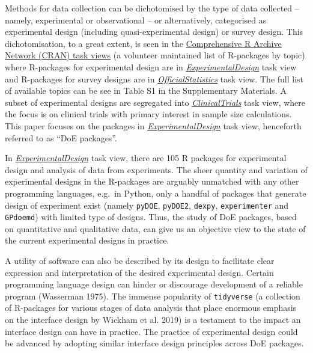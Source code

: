 \documentclass{article}
\begin{document}
Methods for data collection can be dichotomised by the type of data
collected -- namely, experimental or observational -- or alternatively,
categorised as experimental design (including quasi-experimental design)
or survey design. This dichotomisation, to a great extent, is seen in
the \href{https://cran.r-project.org/web/views/}{Comprehensive R Archive
Network (CRAN) task views} (a volunteer maintained list of R-packages by
topic) where R-packages for experimental design are in
\href{http://CRAN.R-project.org/view=ExperimentalDesign}{\emph{ExperimentalDesign}}
task view and R-packages for survey designs are in
\href{http://CRAN.R-project.org/view=OfficialStatistics}{\emph{OfficialStatistics}}
task view. The full list of available topics can be see in Table S1 in
the Supplementary Materials. A subset of experimental designs are
segregated into
\href{http://CRAN.R-project.org/view=ClinicalTrials}{\emph{ClinicalTrials}}
task view, where the focus is on clinical trials with primary interest
in sample size calculations. This paper focuses on the packages in
\href{http://CRAN.R-project.org/view=ExperimentalDesign}{\emph{ExperimentalDesign}}
task view, henceforth referred to as ``DoE packages''.

In
\href{http://CRAN.R-project.org/view=ExperimentalDesign}{\emph{ExperimentalDesign}}
task view, there are 105 R packages for experimental design and analysis
of data from experiments. The sheer quantity and variation of
experimental designs in the R-packages are arguably unmatched with any
other programming languages, e.g.~in Python, only a handful of packages
that generate design of experiment exist (namely \texttt{pyDOE},
\texttt{pyDOE2}, \texttt{dexpy}, \texttt{experimenter} and
\texttt{GPdoemd}) with limited type of designs. Thus, the study of DoE
packages, based on quantitative and qualitative data, can give us an
objective view to the state of the current experimental designs in
practice.

A utility of software can also be described by its design to facilitate
clear expression and interpretation of the desired experimental design.
Certain programming language design can hinder or discourage development
of a reliable program (Wasserman 1975). The immense popularity of
\texttt{tidyverse} (a collection of R-packages for various stages of
data analysis that place enormous emphasis on the interface design by
Wickham et al. 2019) is a testament to the impact an interface design
can have in practice. The practice of experimental design could be
advanced by adopting similar interface design principles across DoE
packages.
\end{document}
